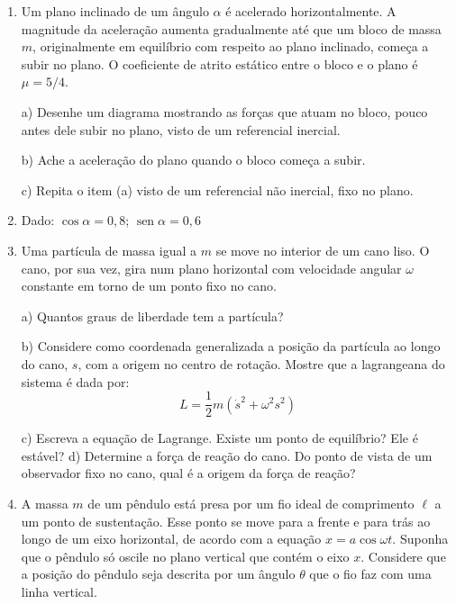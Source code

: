 \begin{enumerate}[start=1,label={\bfseries Q\arabic*.}]
\resposta




\item Um plano inclinado de um ângulo $\alpha$ é acelerado horizontalmente. A magnitude da aceleração aumenta gradualmente até que um bloco de massa $m$, originalmente em equilíbrio com respeito ao plano inclinado, começa a subir no plano. O coeficiente de atrito estático entre o bloco e o plano é $\mu = 5/4$.

a) Desenhe um diagrama mostrando as forças que atuam no bloco, pouco antes dele subir no plano, visto de um referencial inercial.

\resposta

b) Ache a aceleração do plano quando o bloco começa a subir.

\resposta

c) Repita o item (a) visto de um referencial não inercial, fixo no plano.
\item[] Dado: $\operatorname{cos} \alpha = 0,8$; $\operatorname{sen} \alpha = 0,6$

\resposta



\item Uma partícula de massa igual a $m$ se move no interior de um cano liso. O cano, por sua vez, gira num plano horizontal com velocidade angular $\omega$ constante em torno de um ponto fixo no cano.

a) Quantos graus de liberdade tem a partícula?

\resposta

b) Considere como coordenada generalizada a posição da partícula ao longo do cano, $s$, com a origem no centro de rotação. Mostre que a lagrangeana do sistema é dada por:
$$
L = \frac{1}{2} m \left( \dot{s}^{2} + \omega^{2} s^{2} \right)
$$

\resposta

c) Escreva a equação de Lagrange. Existe um ponto de equilíbrio? Ele é estável?
d) Determine a força de reação do cano. Do ponto de vista de um observador fixo no cano, qual é a origem da força de reação?

\resposta




\item A massa $m$ de um pêndulo está presa por um fio ideal de comprimento $\ell$ a um ponto de sustentação. Esse ponto se move para a frente e para trás ao longo de um eixo horizontal, de acordo com a equação $x = a \operatorname{cos} \omega t$. Suponha que o pêndulo só oscile no plano vertical que contém o eixo $x$. Considere que a posição do pêndulo seja descrita por um ângulo $\theta$ que o fio faz com uma linha vertical.


\end{enumerate}
